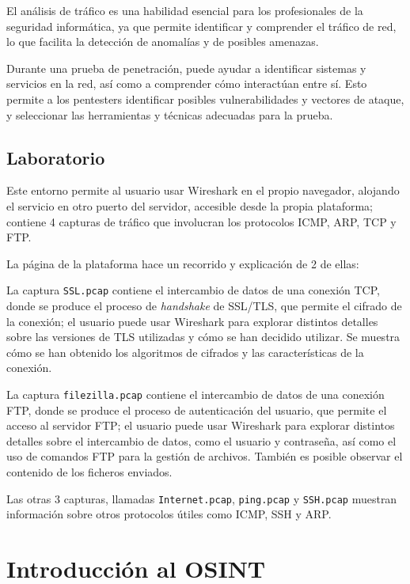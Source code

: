             El análisis de tráfico es una habilidad esencial para los profesionales de la seguridad informática, ya que permite identificar y comprender el tráfico de red, lo que facilita la detección de anomalías y de posibles amenazas.

            Durante una prueba de penetración, puede ayudar a identificar sistemas y servicios en la red, así como a comprender cómo interactúan entre sí. Esto permite a los pentesters identificar posibles vulnerabilidades y vectores de ataque, y seleccionar las herramientas y técnicas adecuadas para la prueba.

        \subsection{Laboratorio}

            Este entorno permite al usuario usar Wireshark en el propio navegador, alojando el servicio en otro puerto del servidor, accesible desde la propia plataforma; contiene 4 capturas de tráfico que involucran los protocolos ICMP, ARP, TCP y FTP.
            
            La página de la plataforma hace un recorrido y explicación de 2 de ellas:

            La captura \texttt{SSL.pcap} contiene el intercambio de datos de una conexión TCP, donde se produce el proceso de \textit{handshake} de SSL/TLS, que permite el cifrado de la conexión; el usuario puede usar Wireshark para explorar distintos detalles sobre las versiones de TLS utilizadas y cómo se han decidido utilizar. Se muestra cómo se han obtenido los algoritmos de cifrados y las características de la conexión.

            La captura \texttt{filezilla.pcap} contiene el intercambio de datos de una conexión FTP, donde se produce el proceso de autenticación del usuario, que permite el acceso al servidor FTP; el usuario puede usar Wireshark para explorar distintos detalles sobre el intercambio de datos, como el usuario y contraseña, así como el uso de comandos FTP para la gestión de archivos. También es posible observar el contenido de los ficheros enviados.

            Las otras 3 capturas, llamadas \texttt{Internet.pcap}, \texttt{ping.pcap} y \texttt{SSH.pcap} muestran información sobre otros protocolos útiles como ICMP, SSH y ARP.


    \section{Introducción al OSINT}
        \label{sec:osint}

